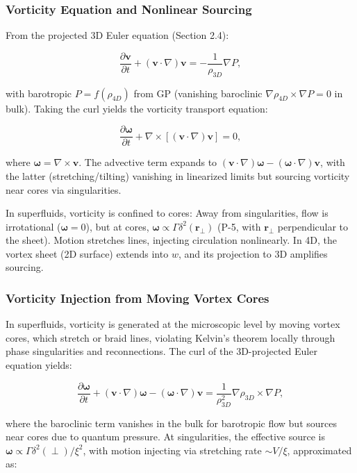 \documentclass{article}
\begin{document}
\subsubsection{Vorticity Equation and Nonlinear Sourcing}

From the projected 3D Euler equation (Section 2.4):

\[
\frac{\partial \mathbf{v}}{\partial t} + (\mathbf{v} \cdot \nabla) \mathbf{v} = -\frac{1}{\rho_{3D}} \nabla P,
\]

with barotropic $P = f(\rho_{4D})$ from GP (vanishing baroclinic $\nabla \rho_{4D} \times \nabla P = 0$ in bulk). Taking the curl yields the vorticity transport equation:

\[
\frac{\partial \boldsymbol{\omega}}{\partial t} + \nabla \times [(\mathbf{v} \cdot \nabla) \mathbf{v}] = 0,
\]

where $\boldsymbol{\omega} = \nabla \times \mathbf{v}$. The advective term expands to $(\mathbf{v} \cdot \nabla) \boldsymbol{\omega} - (\boldsymbol{\omega} \cdot \nabla) \mathbf{v}$, with the latter (stretching/tilting) vanishing in linearized limits but sourcing vorticity near cores via singularities.

In superfluids, vorticity is confined to cores: Away from singularities, flow is irrotational ($\boldsymbol{\omega} = 0$), but at cores, $\boldsymbol{\omega} \propto \Gamma \delta^2(\mathbf{r}_\perp)$ (P-5, with $\mathbf{r}_\perp$ perpendicular to the sheet). Motion stretches lines, injecting circulation nonlinearly. In 4D, the vortex sheet (2D surface) extends into $w$, and its projection to 3D amplifies sourcing.

\subsubsection{Vorticity Injection from Moving Vortex Cores}

In superfluids, vorticity is generated at the microscopic level by moving vortex cores, which stretch or braid lines, violating Kelvin's theorem locally through phase singularities and reconnections. The curl of the 3D-projected Euler equation yields:

\[
\frac{\partial \boldsymbol{\omega}}{\partial t} + (\mathbf{v} \cdot \nabla) \boldsymbol{\omega} - (\boldsymbol{\omega} \cdot \nabla) \mathbf{v} = \frac{1}{\rho_{3D}^2} \nabla \rho_{3D} \times \nabla P,
\]

where the baroclinic term vanishes in the bulk for barotropic flow but sources near cores due to quantum pressure. At singularities, the effective source is $\boldsymbol{\omega} \propto \Gamma \delta^2(\perp) / \xi^2$, with motion injecting via stretching rate $\sim V / \xi$, approximated as:
\end{document}
